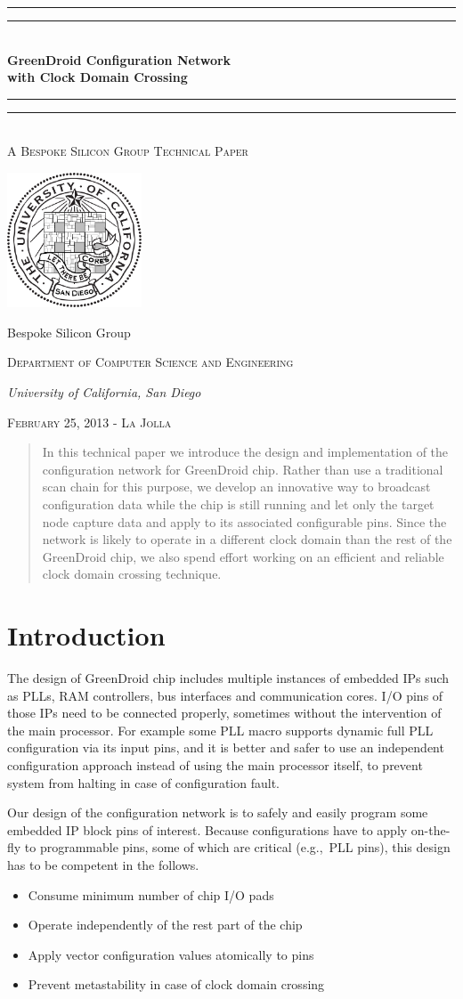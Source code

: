 \documentclass[12pt]{article}
\newcommand{\eg}{e.g.,~}
\newcommand*{\makebsgtitle} {
\begingroup %
  \centering %
  \vspace*{\baselineskip} %

  \rule{\textwidth}{1.6pt}\vspace*{-\baselineskip}\vspace*{2pt} %
  \rule{\textwidth}{0.4pt}\\[\baselineskip] %

  {\LARGE\bfseries GreenDroid Configuration Network \\with Clock Domain Crossing} \\[0.2\baselineskip] %

  \rule{\textwidth}{0.4pt}\vspace*{-\baselineskip}\vspace{3.2pt} %
  \rule{\textwidth}{1.6pt}\\[\baselineskip] %

  \scshape %
  A Bespoke Silicon Group Technical Paper \\[\baselineskip] %

  \vspace*{5\baselineskip} %

  \includegraphics[width=0.3\textwidth]{figures/ucsd_ccores.png}

  \vspace*{5\baselineskip} %
  {\Large Bespoke Silicon Group \par} %
  {\scshape Department of Computer Science and Engineering \par} %
  {\itshape University of California,  San Diego \par} %

  \vfill %

  {\scshape February 25, 2013 - La Jolla} \\[0.3\baselineskip] %
\endgroup}
\begin{document}
\begin{titlepage}
\makebsgtitle %
\end{titlepage}

\begin{abstract}
In this technical paper we introduce the design and implementation of the
configuration network for GreenDroid chip. Rather than use a traditional scan
chain for this purpose, we develop an innovative way to broadcast configuration
data while the chip is still running and let only the target node capture data
and apply to its associated configurable pins. Since the network is likely to
operate in a different clock domain than the rest of the GreenDroid chip, we
also spend effort working on an efficient and reliable clock domain crossing
technique.
\end{abstract}
\newpage

\tableofcontents %
\newpage

\section{Introduction} \label{intro}
The design of GreenDroid chip includes multiple instances of embedded IPs such
as PLLs, RAM controllers, bus interfaces and communication cores. I/O pins of
those IPs need to be connected properly, sometimes without the intervention of
the main processor. For example some PLL macro supports dynamic full PLL
configuration via its input pins, and it is better and safer to use an
independent configuration approach instead of using the main processor itself,
to prevent system from halting in case of configuration fault.

Our design of the configuration network is to safely and easily program some
embedded IP block pins of interest. Because configurations have to apply
on-the-fly to programmable pins, some of which are critical (\eg PLL pins),
this design has to be competent in the follows.
\begin{itemize}
\item Consume minimum number of chip I/O pads
\item Operate independently of the rest part of the chip
\item Apply vector configuration values atomically to pins
\item Prevent metastability in case of clock domain crossing
\end{itemize}
\end{document}
